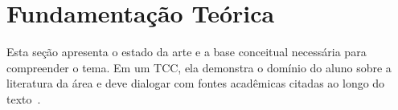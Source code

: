 \section{Fundamentação Teórica}
Esta seção apresenta o estado da arte e a base conceitual necessária para compreender o tema. Em um TCC, ela demonstra o domínio do aluno sobre a literatura da área e deve dialogar com fontes acadêmicas citadas ao longo do texto~\cite{ieeetran}.